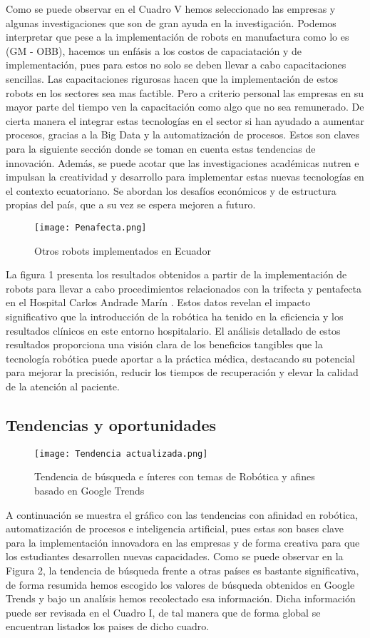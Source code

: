 \documentclass[conference]{IEEEtran}
\begin{document}
Como se puede observar en el Cuadro V hemos seleccionado las empresas y algunas investigaciones que son de gran ayuda en la investigación. Podemos interpretar que pese a la implementación de robots en manufactura como lo es (GM - OBB), hacemos un enfásis a los costos de capaciatación y de implementación, pues para estos no solo se deben llevar a cabo capacitaciones sencillas. Las capacitaciones rigurosas hacen que la implementación de estos robots en los sectores sea mas factible. Pero a criterio personal las empresas en su mayor parte del tiempo ven la capacitación como algo que no sea remunerado. De cierta manera el integrar estas tecnologías en el sector si han ayudado a aumentar procesos, gracias a la Big Data y la automatización de procesos. Estos son claves para la siguiente sección donde se toman en cuenta estas tendencias de innovación. Además, se puede acotar que las investigaciones académicas nutren e impulsan la creatividad y desarrollo para implementar estas nuevas tecnologías en el contexto ecuatoriano. Se abordan los desafíos económicos y de estructura propias del país, que a su vez se espera mejoren a futuro.

\begin{figure}
    \centering
    \texttt{[image: Penafecta.png]}
    \caption{Otros robots implementados en Ecuador}
    \label{fig:enter-label}
\end{figure}
La figura 1 presenta los resultados obtenidos a partir de la implementación de robots para llevar a cabo procedimientos relacionados con la trifecta y pentafecta en el Hospital Carlos Andrade Marín \cite{Salgado2024}. Estos datos revelan el impacto significativo que la introducción de la robótica ha tenido en la eficiencia y los resultados clínicos en este entorno hospitalario. El análisis detallado de estos resultados proporciona una visión clara de los beneficios tangibles que la tecnología robótica puede aportar a la práctica médica, destacando su potencial para mejorar la precisión, reducir los tiempos de recuperación y elevar la calidad de la atención al paciente.
\subsection{Tendencias y oportunidades}
\begin{figure}
    \centering
    \texttt{[image: Tendencia actualizada.png]}
    \caption{Tendencia de búsqueda e ínteres  con temas de Robótica y afines basado en Google Trends}
    \label{fig:enter-label}
\end{figure}
A continuación se muestra el gráfico con las tendencias con afinidad en robótica, automatización de procesos e inteligencia artificial, pues estas son bases clave para la implementación innovadora en las empresas y de forma creativa para que los estudiantes desarrollen nuevas capacidades.
Como se puede observar en la Figura 2, la tendencia de búsqueda frente a otras países es bastante significativa, de forma resumida hemos escogido los valores de búsqueda obtenidos en Google Trends y bajo un analísis hemos recolectado esa información. Dicha información puede ser revisada en el Cuadro I, de tal manera que de forma global se encuentran listados los paises de dicho cuadro.


\end{document}
